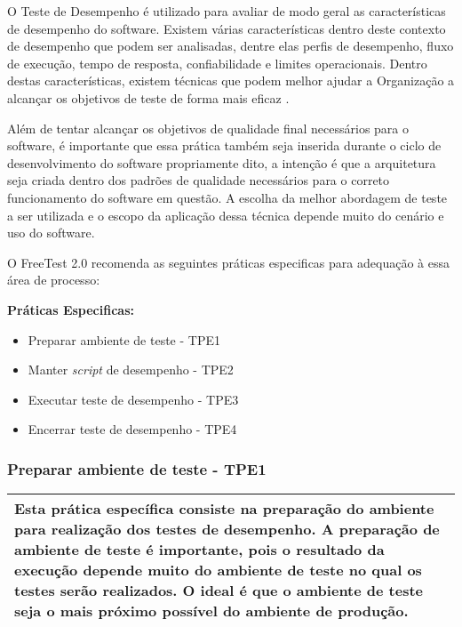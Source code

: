 O Teste de Desempenho é utilizado para avaliar de modo geral as características de desempenho do software. Existem várias características dentro deste contexto de desempenho que podem ser analisadas, dentre elas perfis de desempenho, fluxo de execução, tempo de resposta, confiabilidade e limites operacionais. Dentro destas características, existem técnicas que podem melhor ajudar a Organização a alcançar os objetivos de teste de forma mais eficaz \cite{RUP940320}.

Além de tentar alcançar os objetivos de qualidade final necessários para o software, é importante que essa prática também seja inserida durante o ciclo de desenvolvimento do software propriamente dito, a intenção é que a arquitetura seja criada dentro dos padrões de qualidade necessários para o correto funcionamento do software em questão. A escolha da melhor abordagem de teste a ser utilizada e o escopo da aplicação dessa técnica depende muito do cenário e uso do software.

O FreeTest 2.0 recomenda as seguintes práticas especificas para adequação à essa área de processo:

\textbf{Práticas Especificas:}

\begin{itemize}    
    \item Preparar ambiente de teste - TPE1
    \item Manter \textit{script} de desempenho - TPE2
    \item Executar teste de desempenho - TPE3
    \item Encerrar teste de desempenho - TPE4
\end{itemize}

\subsubsection{Preparar ambiente de teste - TPE1}
\label{sec:tpe1}

\begin{table}[H]
\centering
\begin{tabular}{|p{130mm}|}
\hline
Esta prática específica consiste na preparação do ambiente para realização dos testes de desempenho. A preparação de ambiente de teste é importante, pois o resultado da execução depende muito do ambiente de teste no qual os testes serão realizados. O ideal é que o ambiente de teste seja o mais próximo possível do ambiente de produção.\\ 
\hline
\end{tabular}
\end{table}

